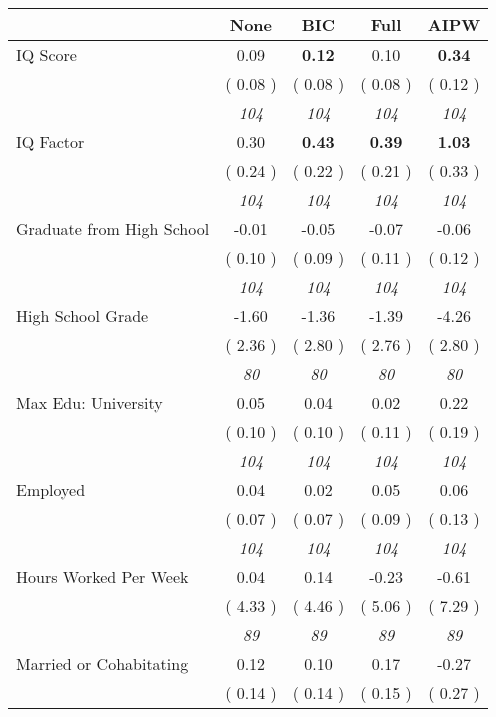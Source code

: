 \begin{tabular}{l c c c c}
\toprule
 & None & BIC & Full & AIPW \\
\midrule
IQ Score &      0.09 & \textbf{      0.12 } &      0.10 & \textbf{     0.34} \\
& (     0.08 ) & (     0.08 ) & (     0.08 ) & (     0.12 ) \\
& \textit{ 104 } & \textit{ 104 } & \textit{ 104 } & \textit{ 104 } \\
IQ Factor &      0.30 & \textbf{      0.43 } & \textbf{      0.39 } & \textbf{     1.03} \\
& (     0.24 ) & (     0.22 ) & (     0.21 ) & (     0.33 ) \\
& \textit{ 104 } & \textit{ 104 } & \textit{ 104 } & \textit{ 104 } \\
Graduate from High School &     -0.01 &     -0.05 &     -0.07 &     -0.06 \\
& (     0.10 ) & (     0.09 ) & (     0.11 ) & (     0.12 ) \\
& \textit{ 104 } & \textit{ 104 } & \textit{ 104 } & \textit{ 104 } \\
High School Grade &     -1.60 &     -1.36 &     -1.39 &     -4.26 \\
& (     2.36 ) & (     2.80 ) & (     2.76 ) & (     2.80 ) \\
& \textit{ 80 } & \textit{ 80 } & \textit{ 80 } & \textit{ 80 } \\
Max Edu: University &      0.05 &      0.04 &      0.02 &      0.22 \\
& (     0.10 ) & (     0.10 ) & (     0.11 ) & (     0.19 ) \\
& \textit{ 104 } & \textit{ 104 } & \textit{ 104 } & \textit{ 104 } \\
Employed &      0.04 &      0.02 &      0.05 &      0.06 \\
& (     0.07 ) & (     0.07 ) & (     0.09 ) & (     0.13 ) \\
& \textit{ 104 } & \textit{ 104 } & \textit{ 104 } & \textit{ 104 } \\
Hours Worked Per Week &      0.04 &      0.14 &     -0.23 &     -0.61 \\
& (     4.33 ) & (     4.46 ) & (     5.06 ) & (     7.29 ) \\
& \textit{ 89 } & \textit{ 89 } & \textit{ 89 } & \textit{ 89 } \\
Married or Cohabitating &      0.12 &      0.10 &      0.17 &     -0.27 \\
& (     0.14 ) & (     0.14 ) & (     0.15 ) & (     0.27 ) \\

\end{tabular}
